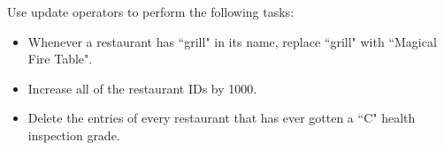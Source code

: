 \begin{problem}
Use update operators to perform the following tasks:
\begin{itemize}
\item Whenever a restaurant has ``grill" in its name, replace ``grill" with ``Magical Fire Table".
\item Increase all of the restaurant IDs by 1000.
\item Delete the entries of every restaurant that has ever gotten a ``C" health inspection grade.
\end{itemize}
\end{problem}
